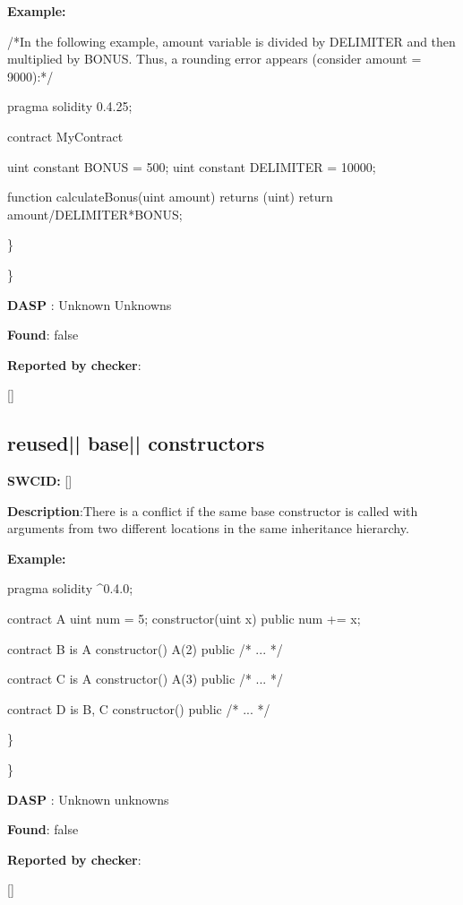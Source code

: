 \documentclass{article}
\begin{document}
\textbf{Example:} 
\begin{ffcode} 

/*In the following example, amount variable is divided by DELIMITER and then multiplied by BONUS. Thus, a rounding error appears (consider amount = 9000):*/ 

pragma solidity 0.4.25;

contract MyContract {

    uint constant BONUS = 500;
    uint constant DELIMITER = 10000;

    function calculateBonus(uint amount) returns (uint) {
        return amount/DELIMITER*BONUS;
    }
}

\end{ffcode} 
\} 

\} 

\textbf{DASP} : Unknown Unknowns

\textbf{Found}: false

\textbf{Reported by checker}: 
\begin{ffcode} 

[]
\end{ffcode} 
\subsection{reused{|\textunderscore| }base{|\textunderscore| }constructors} 
\textbf{SWC{\textunderscore }ID:} []

\textbf{Description}:There is a conflict if the same base constructor is called with arguments from two different locations in the same inheritance hierarchy.


\textbf{Example:} 
\begin{ffcode} 

pragma solidity ^0.4.0;

contract A{
    uint num = 5;
    constructor(uint x) public{
        num += x;
    }
}

contract B is A{
    constructor() A(2) public { /* ... */ }
}

contract C is A {
    constructor() A(3) public { /* ... */ }
}

contract D is B, C {
    constructor() public { /* ... */ }
}

\end{ffcode} 
\} 

\} 

\textbf{DASP} : Unknown unknowns

\textbf{Found}: false

\textbf{Reported by checker}: 
\begin{ffcode} 

[]
\end{ffcode} 
\end{document}
